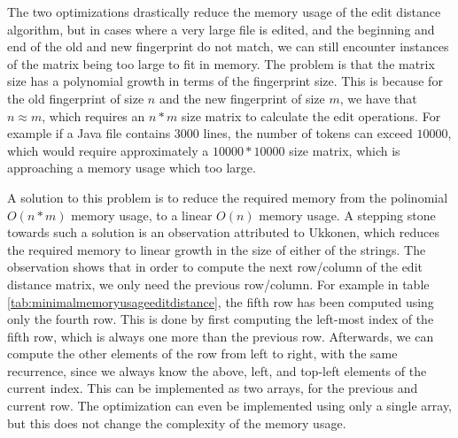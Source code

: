 The two optimizations drastically reduce the memory usage of the edit distance algorithm,
but in cases where a very large file is edited, and the beginning and end of the old and
new fingerprint do not match, we can still encounter instances of the matrix being too
large to fit in memory. The problem is that the matrix size has a polynomial growth in
terms of the fingerprint size. This is because for the old fingerprint of size $n$ and the
new fingerprint of size $m$, we have that $n \approx m$, which requires an $n * m$ size
matrix to calculate the edit operations. For example if a Java file contains $3000$ lines,
the number of tokens can exceed $10000$, which would require approximately a $10000 *
10000$ size matrix, which is approaching a memory usage which too large.

A solution to this problem is to reduce the required memory from the polinomial $O(n*m)$
memory usage, to a linear $O(n)$ memory usage. A stepping stone towards such a solution is
an observation attributed to Ukkonen, which reduces the required memory to linear growth
in the size of either of the strings\cite{UkkonenEditDistance}. The observation shows that
in order to compute the next row/column of the edit distance matrix, we only need the
previous row/column. For example in table \ref{tab:minimalmemoryusageeditdistance}, the
fifth row has been computed using only the fourth row. This is done by first computing the
left-most index of the fifth row, which is always one more than the previous row.
Afterwards, we can compute the other elements of the row from left to right, with the same
recurrence, since we always know the above, left, and top-left elements of the current
index. This can be implemented as two arrays, for the previous and current row. The
optimization can even be implemented using only a single array, but this does not change
the complexity of the memory usage.

